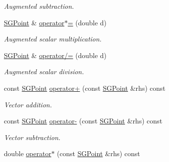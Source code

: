 \begin{DoxyCompactItemize}
\begin{DoxyCompactList}\small\item\em Augmented subtraction. \end{DoxyCompactList}\item 
\hypertarget{class_s_g_point_a2d16a99bae47723ddb8eb0257254bf9e}{\hyperlink{class_s_g_point}{S\+G\+Point} \& \hyperlink{class_s_g_point_a2d16a99bae47723ddb8eb0257254bf9e}{operator$\ast$=} (double d)}\label{class_s_g_point_a2d16a99bae47723ddb8eb0257254bf9e}

\begin{DoxyCompactList}\small\item\em Augmented scalar multiplication. \end{DoxyCompactList}\item 
\hypertarget{class_s_g_point_acd23eead6f4b4240d532beaf1dfff30d}{\hyperlink{class_s_g_point}{S\+G\+Point} \& \hyperlink{class_s_g_point_acd23eead6f4b4240d532beaf1dfff30d}{operator/=} (double d)}\label{class_s_g_point_acd23eead6f4b4240d532beaf1dfff30d}

\begin{DoxyCompactList}\small\item\em Augmented scalar division. \end{DoxyCompactList}\item 
\hypertarget{class_s_g_point_ac65eeaae1fde02ace32a892ad4aeb772}{const \hyperlink{class_s_g_point}{S\+G\+Point} \hyperlink{class_s_g_point_ac65eeaae1fde02ace32a892ad4aeb772}{operator+} (const \hyperlink{class_s_g_point}{S\+G\+Point} \&rhs) const }\label{class_s_g_point_ac65eeaae1fde02ace32a892ad4aeb772}

\begin{DoxyCompactList}\small\item\em Vector addition. \end{DoxyCompactList}\item 
\hypertarget{class_s_g_point_a92c8c0ff9e9ec2946d9a42dbc4767940}{const \hyperlink{class_s_g_point}{S\+G\+Point} \hyperlink{class_s_g_point_a92c8c0ff9e9ec2946d9a42dbc4767940}{operator-\/} (const \hyperlink{class_s_g_point}{S\+G\+Point} \&rhs) const }\label{class_s_g_point_a92c8c0ff9e9ec2946d9a42dbc4767940}

\begin{DoxyCompactList}\small\item\em Vector subtraction. \end{DoxyCompactList}\item 
\hypertarget{class_s_g_point_a4d2ced64673970ebfdf0bc55e1cfac9d}{double \hyperlink{class_s_g_point_a4d2ced64673970ebfdf0bc55e1cfac9d}{operator$\ast$} (const \hyperlink{class_s_g_point}{S\+G\+Point} \&rhs) const }\label{class_s_g_point_a4d2ced64673970ebfdf0bc55e1cfac9d}


\end{DoxyCompactItemize}
